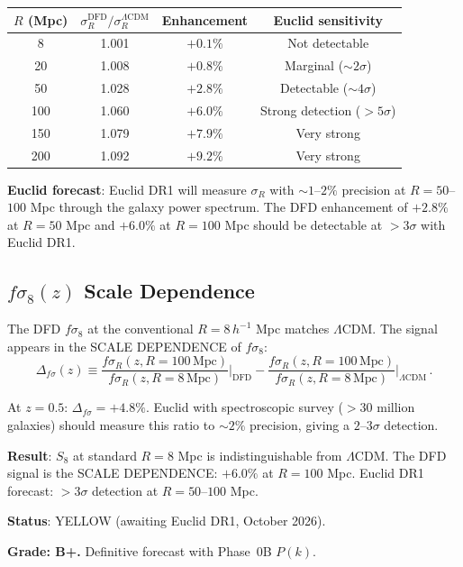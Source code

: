 \documentclass[11pt,a4paper]{article}
\begin{document}
\begin{center}
\begin{longtable}{cccc}
\toprule
$R$ (Mpc) & $\sigma_R^{\mathrm{DFD}}/\sigma_R^{\Lambda\mathrm{CDM}}$ & Enhancement & Euclid sensitivity \\
\midrule
8 & 1.001 & $+0.1\%$ & Not detectable \\
20 & 1.008 & $+0.8\%$ & Marginal ($\sim 2\sigma$) \\
50 & 1.028 & $+2.8\%$ & Detectable ($\sim 4\sigma$) \\
100 & 1.060 & $+6.0\%$ & Strong detection ($> 5\sigma$) \\
150 & 1.079 & $+7.9\%$ & Very strong \\
200 & 1.092 & $+9.2\%$ & Very strong \\
\bottomrule
\end{longtable}
\end{center}

\textbf{Euclid forecast}: Euclid DR1 will measure $\sigma_R$ with $\sim 1$--$2\%$ precision at $R = 50$--$100$ Mpc through the galaxy power spectrum. The DFD enhancement of $+2.8\%$ at $R = 50$ Mpc and $+6.0\%$ at $R = 100$ Mpc should be detectable at $> 3\sigma$ with Euclid DR1.

\subsection{$f\sigma_8(z)$ Scale Dependence}

The DFD $f\sigma_8$ at the conventional $R = 8\,h^{-1}$ Mpc matches $\Lambda$CDM. The signal appears in the SCALE DEPENDENCE of $f\sigma_8$:
\begin{equation}
\Delta_{f\sigma}(z) \equiv \frac{f\sigma_R(z, R = 100\,\mathrm{Mpc})}{f\sigma_R(z, R = 8\,\mathrm{Mpc})}\bigg|_{\mathrm{DFD}} - \frac{f\sigma_R(z, R = 100\,\mathrm{Mpc})}{f\sigma_R(z, R = 8\,\mathrm{Mpc})}\bigg|_{\Lambda\mathrm{CDM}}\,.
\end{equation}

At $z = 0.5$: $\Delta_{f\sigma} = +4.8\%$. Euclid with spectroscopic survey ($> 30$ million galaxies) should measure this ratio to $\sim 2\%$ precision, giving a $2$--$3\sigma$ detection.

\begin{tcolorbox}[colback=yellow!5!white, colframe=yellow!60!black, title={Agent 10: $S_8$ Scale Dependence --- Remains YELLOW, Euclid Detectable}]
\textbf{Result}: $S_8$ at standard $R = 8$ Mpc is indistinguishable from $\Lambda$CDM. The DFD signal is the SCALE DEPENDENCE: $+6.0\%$ at $R = 100$ Mpc. Euclid DR1 forecast: $> 3\sigma$ detection at $R = 50$--$100$ Mpc.

\textbf{Status}: YELLOW (awaiting Euclid DR1, October 2026).

\textbf{Grade: B+.} Definitive forecast with Phase~0B $P(k)$.
\end{tcolorbox}
\end{document}
